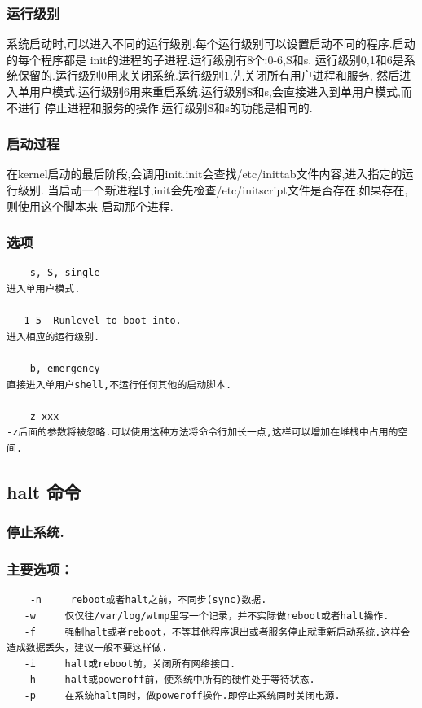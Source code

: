 \subsubsection{运行级别}

系统启动时,可以进入不同的运行级别.每个运行级别可以设置启动不同的程序.启动的每个程序都是
init的进程的子进程.运行级别有8个:0-6,S和s.
运行级别0,1和6是系统保留的.运行级别0用来关闭系统.运行级别1,先关闭所有用户进程和服务,
然后进入单用户模式.运行级别6用来重启系统.运行级别S和s,会直接进入到单用户模式,而不进行
停止进程和服务的操作.运行级别S和s的功能是相同的.

\subsubsection{启动过程}

在kernel启动的最后阶段,会调用init.init会查找/etc/inittab文件内容,进入指定的运行级别.
当启动一个新进程时,init会先检查/etc/initscript文件是否存在.如果存在,则使用这个脚本来
启动那个进程.

\subsubsection{选项}

{\begin{shaded}\begin{verbatim}
   -s, S, single
进入单用户模式.

   1-5  Runlevel to boot into.
进入相应的运行级别.

   -b, emergency
直接进入单用户shell,不运行任何其他的启动脚本.

   -z xxx
-z后面的参数将被忽略.可以使用这种方法将命令行加长一点,这样可以增加在堆栈中占用的空间.
\end{verbatim}\end{shaded}}
\subsection{halt 命令}

\subsubsection{停止系统.}

\subsubsection{主要选项：}

{\begin{shaded}\begin{verbatim}
    -n     reboot或者halt之前，不同步(sync)数据.
   -w     仅仅往/var/log/wtmp里写一个记录，并不实际做reboot或者halt操作.
   -f     强制halt或者reboot，不等其他程序退出或者服务停止就重新启动系统.这样会造成数据丢失，建议一般不要这样做.
   -i     halt或reboot前，关闭所有网络接口.
   -h     halt或poweroff前，使系统中所有的硬件处于等待状态.
   -p     在系统halt同时，做poweroff操作.即停止系统同时关闭电源.
\end{verbatim}\end{shaded}}
